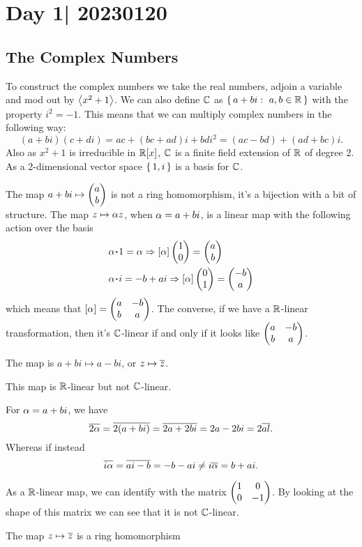 \documentclass[12pt]{memoir}
\begin{document}
\section{Day 1| 20230120}

\subsection{The Complex Numbers}

To construct the complex numbers we take the real numbers, adjoin a variable and mod out by $\left\langle x^2+1\right\rangle$. We can also define $\mathbb{C}$ as $\{\,a+bi:\ a,b\in\mathbb{R}\,\}$ with the property $i^2=-1$. This means that we can multiply complex numbers in the following way:
$$(a+bi)(c+di)=ac+(bc+ad)i+bdi^2=(ac-bd)+(ad+bc)i.$$
Also as $x^2+1$ is irreducible in $\mathbb{R}[x]$, $\mathbb{C}$ is a finite field extension of $\mathbb{R}$ of degree 2. As a 2-dimensional vector space $\{\,1,i\,\}$ is a basis for $\mathbb{C}$.\par 
The map $a+bi\mapsto\begin{pmatrix} a \\ b \end{pmatrix}$ is not a ring homomorphism, it's a bijection with a bit of structure. The map $z\mapsto \alpha z$, when $\alpha=a+bi$, is a linear map with the following action over the basis 
\begin{align*}
    &\al\. 1=\al\To[\al]\twobyone{1}{0}=\twobyone{a}{b}\\
    &\al\. i=-b+ai\To[\al]\twobyone{0}{1}=\twobyone{-b}{a}
\end{align*}
which means that $[\alpha]=\begin{pmatrix} a & -b \\ b & a \end{pmatrix}$. The converse, if we have a $\mathbb{R}$-linear transformation, then it's $\mathbb{C}$-linear if and only if it looks like $\begin{pmatrix} a & -b \\ b & a \end{pmatrix}$.

\begin{Def}
The  map is $a+bi\mapsto a-bi$, or $z\mapsto\overline z$.
\end{Def}

This map is $\mathbb{R}$-linear but not $\mathbb{C}$-linear. 

\begin{Ex}
For $\alpha=a+bi$, we have 
$$\overline{2\alpha}=\overline{2(a+bi)}=\overline{2a+2bi}=2a-2bi=2\overline{al}.$$
Whereas if instead 
$$\overline{i\alpha}=\overline{ai-b}=-b-ai\neq i\overline{\alpha}=b+ai.$$
\end{Ex}

As a $\mathbb{R}$-linear map, we can identify with the matrix $\begin{pmatrix} 1 & 0 \\ 0 & -1 \end{pmatrix}$. By looking at the shape of this matrix we can see that it is not $\mathbb{C}$-linear.

\begin{Lem}
The map $z\mapsto\overline z$ is a ring homomorphism
\end{Lem}
\end{document}
